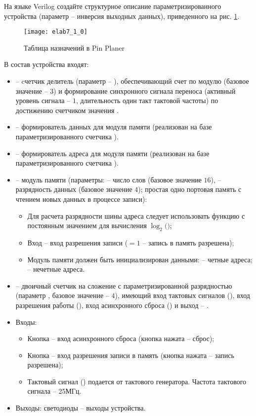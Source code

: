 На языке Verilog создайте структурное описание параметризированного устройства (параметр  -- инверсия выходных данных), приведенного на рис. \ref{fig:elab7_1_0}.

\begin{figure}[H]
\begin{center}
	\texttt{[image: elab7\_1\_0]}
	\caption{Таблица назначений в Pin Planer}
	\label{fig:elab7_1_0}
\end{center}
\end{figure}
\vspace{-0.5cm}

В состав устройства входят:
\begin{itemize}
	\item {} -- cчетчик делитель (параметр -- ), обеспечивающий счет по модулю  (базовое значение -- $3$) и формирование синхронного сигнала переноса (активный уровень сигнала -- $1$, длительность один такт тактовой частоты) по достижению счетчиком значения .
	\item {} -- формирователь данных для модуля памяти (реализован на базе параметризированного счетчика ).
	\item {} -- формирователь адреса для модуля памяти (реализован на базе параметризированного счетчика ).
	\item {} -- модуль памяти (параметры:  -- число слов (базовое значение $16$),  -- разрядность данных (базовое значение $4$); простая одно портовая память с чтением новых данных в процессе записи):
		\begin{itemize}
			\item Для расчета разрядности шины адреса следует использовать функцию с постоянным значением для вычисления $\log_2($$)$;
			\item Вход  – вход разрешения записи ($=1$ -- запись в память разрешена);
			\item Модуль памяти должен быть инициализирован данными:  -- четные адреса;  -- нечетные адреса.
		\end{itemize}
	\item {} -- двоичный счетчик на сложение с параметризированной разрядностью (параметр , базовое значение -- $4$), имеющий вход тактовых сигналов (), вход разрешения работы (), вход асинхронного сброса () и выход -- .
	\item Входы:
		\begin{itemize}
			\item Кнопка  -- вход асинхронного сброса (кнопка нажата – сброс);
			\item Кнопка  -- вход разрешения записи в память (кнопка нажата – запись разрешена);
			\item Тактовый сигнал () подается от тактового генератора. Частота тактового сигнала -- 25МГц.
		\end{itemize}
	\item Выходы: светодиоды  -- выходы устройства.
\end{itemize}

